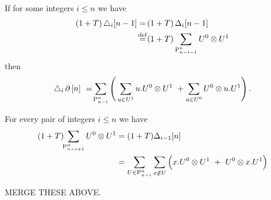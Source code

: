 \begin{lemma} \label{l:triangle boundary}
	If for some integers $i \leq n$ we have
	\begin{align*}
	(1+T) \, \triangle_i [n-1] = \,
	&(1+T) \, \Delta_i [n-1] \\ \stackrel{\mathrm{def}}{=}
	&(1+T) \sum_{\mathrm{P}_{n-i-1}^n} {U^0} \otimes {U^1}
	\end{align*}
	then
	\begin{align}
	\label{e:triangle of boundary}
	\triangle_i \operatorname{\partial} \, [n] \ =\!
	\sum_{\mathrm{P}_{n-i}^n} \left( \,
	\sum_{u \in U^1} {u.U^0} \otimes {U^1} \ +
	\sum_{u \in U^0} {U^0} \otimes {u.U^1} \right).
	\end{align}
\end{lemma}

\begin{lemma} \label{l:boundary gives the lower case}
	For every pair of integers $i \leq n$ we have
	\begin{align*}
	(1+T) \!\! \sum_{\P_{n-i+1}^n} U^0 \ot U^1 &=
	(1+T) \Delta_{i-1} [n] \\ &=
	\sum_{U \in \P_{n-i}^n} \sum_{x \notin U} \Big( x.U^0 \ot U^1\ +\ {U^0} \ot {x.U^1} \Big)
	\end{align*}
\end{lemma}

MERGE THESE ABOVE.